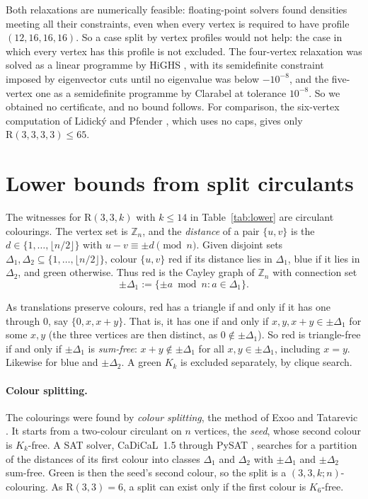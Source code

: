 \documentclass[11pt]{article}
\theoremstyle{spacedplain}
\theoremstyle{spaceddef}
\theoremstyle{spacedremark}
\newcommand{\R}{\mathrm{R}}
\begin{document}
Both relaxations are numerically feasible: floating-point solvers found densities meeting all their constraints, even when every vertex is required to have profile $(12,16,16,16)$.
So a case split by vertex profiles would not help: the case in which every vertex has this profile is not excluded.
The four-vertex relaxation was solved as a linear programme by HiGHS \cite{HH18}, with its semidefinite constraint imposed by eigenvector cuts until no eigenvalue was below $-10^{-8}$, and the five-vertex one as a semidefinite programme by Clarabel \cite{GC24} at tolerance $10^{-8}$.
So we obtained no certificate, and no bound follows.
For comparison, the six-vertex computation of Lidick\'y and Pfender \cite[Appendix~A]{LP21}, which uses no caps, gives only $\R(3,3,3,3)\le 65$.

\section{Lower bounds from split circulants}\label{sec:lower}

The witnesses for $\R(3,3,k)$ with $k\le 14$ in Table~\ref{tab:lower} are circulant colourings.
The vertex set is $\mathbb Z_n$, and the \emph{distance} of a pair $\{u,v\}$ is the $d\in\{1,\dots,\lfloor n/2\rfloor\}$ with $u-v\equiv\pm d\pmod n$.
Given disjoint sets $\Delta_1,\Delta_2\subseteq\{1,\dots,\lfloor n/2\rfloor\}$, colour $\{u,v\}$ red if its distance lies in $\Delta_1$, blue if it lies in $\Delta_2$, and green otherwise.
Thus red is the Cayley graph of $\mathbb Z_n$ with connection set
\[
\pm\Delta_1:=\{\pm a\bmod n:a\in\Delta_1\}.
\]

As translations preserve colours, red has a triangle if and only if it has one through $0$, say $\{0,x,x+y\}$.
That is, it has one if and only if $x,y,x+y\in\pm\Delta_1$ for some $x,y$ (the three vertices are then distinct, as $0\notin\pm\Delta_1$).
So red is triangle-free if and only if $\pm\Delta_1$ is \emph{sum-free}: $x+y\notin\pm\Delta_1$ for all $x,y\in\pm\Delta_1$, including $x=y$.
Likewise for blue and $\pm\Delta_2$.
A green $K_k$ is excluded separately, by clique search.

\paragraph{Colour splitting.}
The colourings were found by \emph{colour splitting}, the method of Exoo and Tatarevic \cite[\S3.5]{ET15}.
It starts from a two-colour circulant on $n$ vertices, the \emph{seed}, whose second colour is $K_k$-free.
A SAT solver, CaDiCaL~1.5 through PySAT \cite{IMM18}, searches for a partition of the distances of its first colour into classes $\Delta_1$ and $\Delta_2$ with $\pm\Delta_1$ and $\pm\Delta_2$ sum-free.
Green is then the seed's second colour, so the split is a $(3,3,k;n)$-colouring.
As $\R(3,3)=6$, a split can exist only if the first colour is $K_6$-free.
\end{document}
